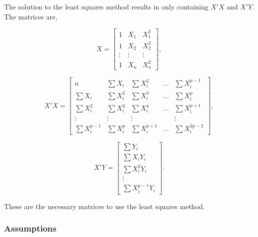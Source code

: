  \noindent The solution to the least squares method results in only containing $X'X$ and $X'Y$.
 The matrices are,
 
 
\begin{equation}
 X=
 \left[
 \begin{array}{ccc}
 	1 &X_1	& X_1^2\\ 
 	1 & X_2 & X_2^2	\\
 	\vdots & \vdots & \vdots \\
 	1 & X_n& X_n^2
 \end{array}
 \right],
\end{equation}
 
 \begin{equation}
 	X'X=
 \left[
 \begin{array}{ccccc}
 	n &\sum X_i	& \sum X_i^2 & ... &\sum X_i^{p-1}\\ 
 	\sum X_i & \sum X_i^2 & \sum X_i^3&...& \sum X_i^p	\\
 	\sum X_i^2 & \sum X_i^3 & \sum X_i^4 & ... & \sum X_i^{p+1}\\
 	\vdots&\vdots&\vdots& & \vdots	\\
 	\sum X_i^{p-1} &\sum X_i^p& \sum X_i^{p+1} & ... & \sum X_i^{2p-2}
 \end{array}
 \right],
\end{equation}
 
 \begin{equation}
 	X' Y=
 \left[
 \begin{array}{c}
 	\sum Y_i\\ 
 	\sum X_i Y_i	\\
 	\sum X_i^2 Y_i \\
 	\vdots	\\
 	\sum X_i^{p-1} Y_i
 \end{array}
 \right].
\end{equation}
 
 \noindent These are the necessary matrices to use the least squares method.

	\subsubsection{Assumptions}
	